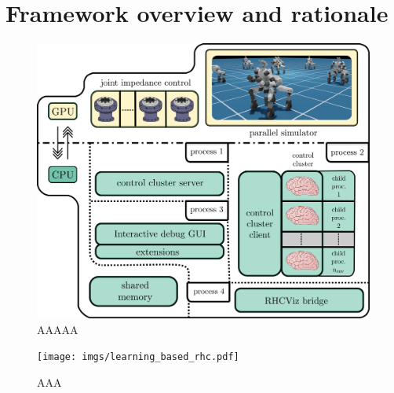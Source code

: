 \section{Framework overview and rationale}

\begin{figure}[t]
	\centering
	\includegraphics[width=1.0\columnwidth]{imgs/cocluster_arch.pdf}
	\caption{AAAAA}
	\label{fig:coclbridge_arch}
\end{figure}
\cite{mystuff::lrhccontrol}
\cite{mystuff::omnirobogym}
\cite{mystuff::coclusterbridge}
\cite{mystuff::rhcviz}
\cite{mystuff::sharsoripcpp}

\begin{figure}[t]
	\centering
	\vspace{0.1cm}
	\texttt{[image: imgs/learning\_based\_rhc.pdf]}
	\caption{AAA}
	\label{fig:lrhc_arch}
\end{figure}